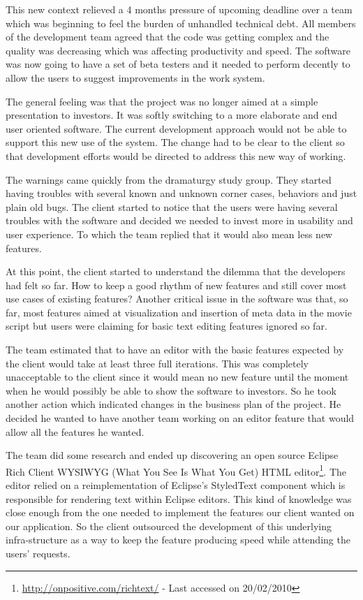 \documentclass[lnbip]{svmultln}
\begin{document}
This new context relieved a 4 months pressure of upcoming deadline
over a team which was beginning to feel the burden of unhandled
technical debt. All members of the development team agreed that the
code was getting complex and the quality was decreasing which was
affecting productivity and speed. The software was now going to have a
set of beta testers and it needed to perform decently to allow the
users to suggest improvements in the work system.

The general feeling was that the project was no longer aimed at a
simple presentation to investors. It was softly switching to a more
elaborate and end user oriented software. The current development
approach would not be able to support this new use of the system. The
change had to be clear to the client so that development efforts would
be directed to address this new way of working.

The warnings came quickly from the dramaturgy study group. They
started having troubles with several known and unknown corner cases,
behaviors and just plain old bugs. The client started to notice that
the users were having several troubles with the software and decided
we needed to invest more in usability and user experience. To which
the team replied that it would also mean less new features.

At this point, the client started to understand the dilemma that the
developers had felt so far. How to keep a good rhythm of new features
and still cover most use cases of existing features? Another critical
issue in the software was that, so far, most features aimed at
visualization and insertion of meta data in the movie script but users
were claiming for basic text editing features ignored so far.

The team estimated that to have an editor with the basic features
expected by the client would take at least three full iterations. This
was completely unacceptable to the client since it would mean no new
feature until the moment when he would possibly be able to show the
software to investors. So he took another action which indicated
changes in the business plan of the project. He decided he wanted to
have another team working on an editor feature that would allow all
the features he wanted.

The team did some research and ended up discovering an open source
Eclipse Rich Client WYSIWYG (What You See Is What You Get) HTML
editor\footnote{\url{http://onpositive.com/richtext/} - Last accessed on
20/02/2010}. The editor relied on a reimplementation of Eclipse's
StyledText component which is responsible for rendering text within
Eclipse editors. This kind of knowledge was close enough from the one
needed to implement the features our client wanted on our
application. So the client outsourced the development of this
underlying infra-structure as a way to keep the feature producing
speed while attending the users' requests.
\end{document}
